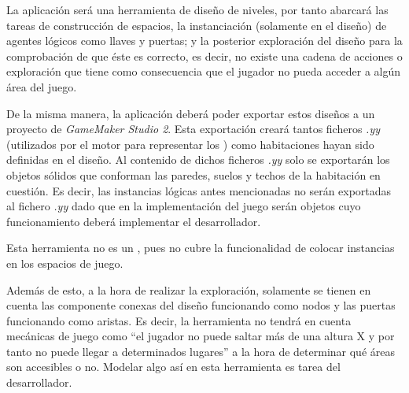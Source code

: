 La aplicación será una herramienta de diseño de niveles, por tanto abarcará las tareas de construcción de espacios, la instanciación (solamente en el diseño) de agentes lógicos como llaves y puertas; y la posterior exploración del diseño para la comprobación de que éste es correcto, es decir, no existe una cadena de acciones o exploración que tiene como consecuencia que el jugador no pueda acceder a algún área del juego.

De la misma manera, la aplicación deberá poder exportar estos diseños a un proyecto de \textit{GameMaker Studio 2}. Esta exportación creará tantos ficheros \textit{.yy} (utilizados por el motor para representar los ) como habitaciones hayan sido definidas en el diseño. Al contenido de dichos ficheros \textit{.yy} solo se exportarán los objetos sólidos que conforman las paredes, suelos y techos de la habitación en cuestión.
Es decir, las instancias lógicas antes mencionadas no serán exportadas al fichero \textit{.yy} dado que en la implementación del juego serán objetos cuyo funcionamiento deberá implementar el desarrollador.

Esta herramienta no es un , pues no cubre la funcionalidad de colocar instancias en los espacios de juego.

Además de esto, a la hora de realizar la exploración, solamente se tienen en cuenta las componente conexas del diseño funcionando como nodos y las puertas funcionando como aristas. Es decir, la herramienta no tendrá en cuenta mecánicas de juego como ``el jugador no puede saltar más de una altura X y por tanto no puede llegar a determinados lugares'' a la hora de determinar qué áreas son accesibles o no. Modelar algo así en esta herramienta es tarea del desarrollador.